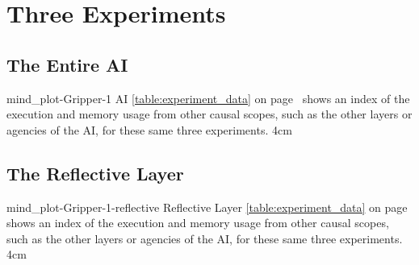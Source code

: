 \newcommand{\experimentdatacommontablereference}{%
  {\mbox{\autoref{table:experiment_data}}} on
  {\mbox{page~\pageref{table:experiment_data}}} shows an index of
  the execution and memory usage from other causal scopes, such as
  the other layers or agencies of the AI, for these same three
  experiments.
}

\section{Three Experiments}

{\clearpage
  \begin{samepage}
    \subsection{The Entire AI}
    \experimentcausegroupplots{\dataappendixmaxtime}
                              {\dataappendixexperimentonemaxtime}
                              {\dataappendixexperimenttwomaxtime}
                              {\dataappendixexperimentthreemaxtime}
                              {\dataappendixexperimentonename}
                              {\dataappendixexperimenttwoname}
                              {\dataappendixexperimentthreename}
                              {\dataappendixexperimentoneprettyname}
                              {\dataappendixexperimenttwoprettyname}
                              \experimentcausegroupplotscontinued{\dataappendixexperimentthreeprettyname}
                                                                 {mind_plot-Gripper-1}
                                                                 {AI}
                                                                 {\experimentdatacommontablereference}
                                                                 {4cm}
  \end{samepage}
}
{\clearpage
  \begin{samepage}
    \subsection{The Reflective Layer}
    \experimentcausegroupplots{\dataappendixmaxtime}
                              {\dataappendixexperimentonemaxtime}
                              {\dataappendixexperimenttwomaxtime}
                              {\dataappendixexperimentthreemaxtime}
                              {\dataappendixexperimentonename}
                              {\dataappendixexperimenttwoname}
                              {\dataappendixexperimentthreename}
                              {\dataappendixexperimentoneprettyname}
                              {\dataappendixexperimenttwoprettyname}
                              \experimentcausegroupplotscontinued{\dataappendixexperimentthreeprettyname}
                                                                 {mind_plot-Gripper-1-reflective}
                                                                 {Reflective Layer}
                                                                 {\experimentdatacommontablereference}
                                                                 {4cm}
  \end{samepage}
}
